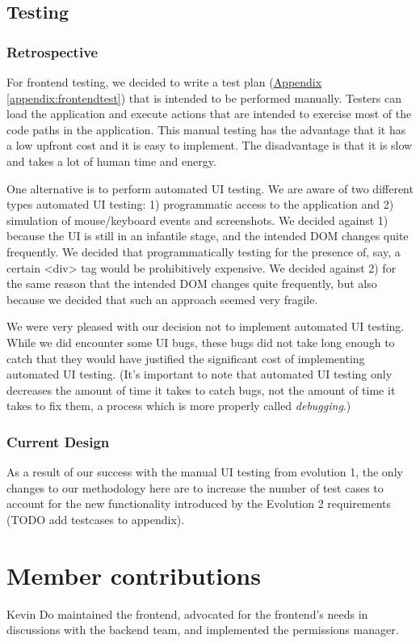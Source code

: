 \documentclass[12pt]{article}
\begin{document}
\subsection{Testing}
\subsubsection{Retrospective}
For frontend testing, we decided to write a test plan (\hyperref[appendix:frontendtest]{Appendix \ref{appendix:frontendtest}}) that is intended to be performed manually. Testers can load the application and execute actions that are intended to exercise most of the code paths in the application. This manual testing has the advantage that it has a low upfront cost and it is easy to implement. The disadvantage is that it is slow and takes a lot of human time and energy.

One alternative is to perform automated UI testing. We are aware of two different types automated UI testing: 1) programmatic access to the application and 2) simulation of mouse/keyboard events and screenshots. We decided against 1) because the UI is still in an infantile stage, and the intended DOM changes quite frequently. We decided that programmatically testing for the presence of, say, a certain <div> tag would be prohibitively expensive. We decided against 2) for the same reason that the intended DOM changes quite frequently, but also because we decided that such an approach seemed very fragile.

We were very pleased with our decision not to implement automated UI testing. While we did encounter some UI bugs, these bugs did not take long enough to catch that they would have justified the significant cost of implementing automated UI testing. (It's important to note that automated UI testing only decreases the amount of time it takes to catch bugs, not the amount of time it takes to fix them, a process which is more properly called \emph{debugging}.)

\subsubsection{Current Design}
As a result of our success with the manual UI testing from evolution 1, the only changes to our methodology here are to increase the number of test cases to account for the new functionality introduced by the Evolution 2 requirements (TODO add testcases to appendix).

\section{Member contributions}
Kevin Do maintained the frontend, advocated for the frontend's needs in discussions with the backend team, and implemented the permissions manager.
\end{document}
